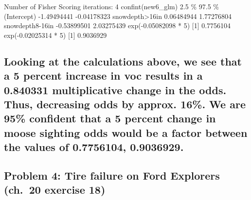 \documentclass[
]{article}
\newenvironment{Shaded}{\begin{snugshade}}{\end{snugshade}}
\newcommand{\DecValTok}[1]{\textcolor[rgb]{0.00,0.00,0.81}{#1}}
\newcommand{\FloatTok}[1]{\textcolor[rgb]{0.00,0.00,0.81}{#1}}
\newcommand{\FunctionTok}[1]{\textcolor[rgb]{0.00,0.00,0.00}{#1}}
\newcommand{\NormalTok}[1]{#1}
\newcommand{\SpecialCharTok}[1]{\textcolor[rgb]{0.00,0.00,0.00}{#1}}
\begin{document}
\begin{Shaded}
\begin{Highlighting}[]
\NormalTok{Number of Fisher Scoring iterations}\SpecialCharTok{:} \DecValTok{4}
\FunctionTok{confint}\NormalTok{(new6\_glm)}
                      \FloatTok{2.5} \SpecialCharTok{\%      97.5 \%}
\NormalTok{(Intercept)     }\SpecialCharTok{{-}}\FloatTok{1.49494441} \SpecialCharTok{{-}}\FloatTok{0.04178323}
\NormalTok{snowdepth}\SpecialCharTok{\textgreater{}}\NormalTok{16in   }\FloatTok{0.06484944}  \FloatTok{1.77276804}
\NormalTok{snowdepth8}\SpecialCharTok{{-}}\NormalTok{16in }\SpecialCharTok{{-}}\FloatTok{0.53899501}  \FloatTok{2.03275439}
\FunctionTok{exp}\NormalTok{(}\SpecialCharTok{{-}}\FloatTok{0.05082098} \SpecialCharTok{*} \DecValTok{5}\NormalTok{)}
\NormalTok{[}\DecValTok{1}\NormalTok{] }\FloatTok{0.7756104}
\FunctionTok{exp}\NormalTok{(}\SpecialCharTok{{-}}\FloatTok{0.02025314} \SpecialCharTok{*} \DecValTok{5}\NormalTok{)}
\NormalTok{[}\DecValTok{1}\NormalTok{] }\FloatTok{0.9036929}
\end{Highlighting}
\end{Shaded}

\hypertarget{looking-at-the-calculations-above-we-see-that-a-5-percent-increase-in-voc-results-in-a-0.840331-multiplicative-change-in-the-odds.-thus-decreasing-odds-by-approx.-16.-we-are-95-confident-that-a-5-percent-change-in-moose-sighting-odds-would-be-a-factor-between-the-values-of-0.7756104-0.9036929.}{%
\subsection{Looking at the calculations above, we see that a 5 percent
increase in voc results in a 0.840331 multiplicative change in the odds.
Thus, decreasing odds by approx. 16\%. We are 95\% confident that a 5
percent change in moose sighting odds would be a factor between the
values of 0.7756104,
0.9036929.}\label{looking-at-the-calculations-above-we-see-that-a-5-percent-increase-in-voc-results-in-a-0.840331-multiplicative-change-in-the-odds.-thus-decreasing-odds-by-approx.-16.-we-are-95-confident-that-a-5-percent-change-in-moose-sighting-odds-would-be-a-factor-between-the-values-of-0.7756104-0.9036929.}}

\hypertarget{problem-4-tire-failure-on-ford-explorers-ch.-20-exercise-18}{%
\subsection{Problem 4: Tire failure on Ford Explorers (ch.~20 exercise
18)}\label{problem-4-tire-failure-on-ford-explorers-ch.-20-exercise-18}}
\end{document}
